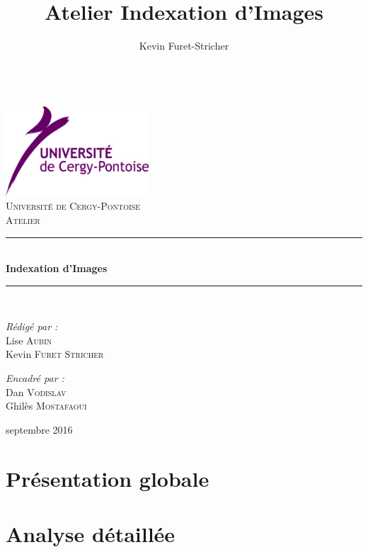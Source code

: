 \documentclass[a4paper,12pt]{report}
\author{Kevin Furet-Stricher}
\title{Atelier Indexation d'Images}
\newcommand{\HRule}{\rule{\linewidth}{0.5mm}}
\begin{document}
\begin{titlepage}
	\begin{center}

	~\\[1.5cm]

	\includegraphics[width=0.4\textwidth]{./logo}~\\[1cm]
	\textsc{\Large Université de Cergy-Pontoise}\\[1.5cm]

	\textsc{\large Atelier}\\[0.5cm]

	\HRule \\[0.4cm]
	{ \LARGE \bfseries Indexation d'Images \\[0.4cm] }

	\HRule \\[1.5cm]

	\begin{minipage}{0.4\textwidth}
	\begin{flushleft} 
	\emph{Rédigé par :}\\
	Lise \textsc{Aubin}\\
	Kevin \textsc{Furet Stricher}
	\end{flushleft}
	\end{minipage}
	\begin{minipage}{0.4\textwidth}
	\begin{flushright} 
	\emph{Encadré par :} \\
	Dan \textsc{Vodislav}\\
	Ghilès \textsc{Mostafaoui}\\
	\end{flushright}
	\end{minipage}
	
	\vfill
	
	{\large septembre 2016}
	
	\end{center}
\end{titlepage}

\tableofcontents



\chapter{Présentation globale}

	
	
	
	
\chapter{Analyse détaillée}

	
	
	
	

\end{document}
